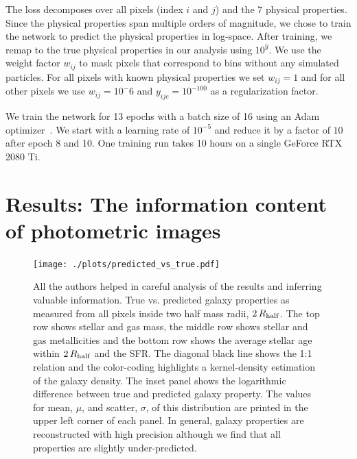 \documentclass[conference]{IEEEtran}
\begin{document}
The loss decomposes over all pixels (index $i$ and $j$) and the 7 physical properties. Since the physical properties span multiple orders of magnitude, we chose to train the network to predict the physical properties in log-space. After training, we remap to the true physical properties in our analysis using $10^{\hat{y}}$. We use the weight factor $w_{ij}$ to mask pixels that correspond to bins without any simulated particles. For all pixels with known physical properties we set $w_{ij}=1$ and for all other pixels we use $w_{ij} = 10^-6$ and $y_{ijc} = 10^{-100}$ as a regularization factor.

We train the network for 13 epochs with a batch size of 16 using an Adam optimizer~\cite{kingma2014adam}. We start with a learning rate of $10^{-5}$ and reduce it by a factor of $10$ after epoch 8 and 10. One training run takes 10 hours on a single GeForce RTX 2080 Ti.


\section{Results: The information content of photometric images}
\label{sec:results}

\begin{figure}
\vspace{-.4cm}
\begin{center}
\texttt{[image: ./plots/predicted\_vs\_true.pdf]}
\end{center}
\vspace{-.5cm}
\caption{All the authors helped in careful analysis of the results and inferring valuable information. True vs. predicted galaxy properties as measured from all pixels inside two half mass radii, $2\,R_{\rm half}$. The top row shows stellar and gas mass, the middle row shows stellar and gas metallicities and the bottom row shows the average stellar age within $2\,R_{\rm half}$ and the SFR. The diagonal black line shows the 1:1 relation and the color-coding highlights a kernel-density estimation of the galaxy density. The inset panel shows the logarithmic difference between true and predicted galaxy property. The values for mean, $\mu$, and scatter, $\sigma$, of this distribution are printed in the upper left corner of each panel. In general, galaxy properties are reconstructed with high precision although we find that all properties are slightly under-predicted.}
\label{fig:true_vs_pred}
\end{figure}
\end{document}
